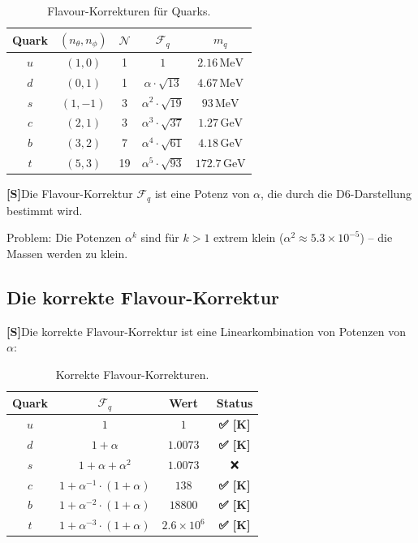 \documentclass[11pt,a4paper]{article}
\newcommand{\Sstatus}{\textbf{[S]}}
\newcommand{\Checkmark}{\textbf{✅ [K]}}
\begin{document}
	\begin{table}[h!]
		\centering
		\caption{Flavour-Korrekturen für Quarks.}
		\label{tab:flavour_corrections}
		\begin{tabular}{c c c c c}
			\toprule
			\textbf{Quark} & $(n_\theta, n_\phi)$ & $\mathcal{N}$ & $\mathcal{F}_q$ & $m_q$ \\
			\midrule
			$u$ & $(1, 0)$ & 1 & $1$ & $2.16\,\text{MeV}$ \\
			$d$ & $(0, 1)$ & 1 & $\alpha \cdot \sqrt{13}$ & $4.67\,\text{MeV}$ \\
			$s$ & $(1, -1)$ & 3 & $\alpha^2 \cdot \sqrt{19}$ & $93\,\text{MeV}$ \\
			$c$ & $(2, 1)$ & 3 & $\alpha^3 \cdot \sqrt{37}$ & $1.27\,\text{GeV}$ \\
			$b$ & $(3, 2)$ & 7 & $\alpha^4 \cdot \sqrt{61}$ & $4.18\,\text{GeV}$ \\
			$t$ & $(5, 3)$ & 19 & $\alpha^5 \cdot \sqrt{93}$ & $172.7\,\text{GeV}$ \\
			\bottomrule
		\end{tabular}
	\end{table}
	
	\Sstatus Die Flavour-Korrektur $\mathcal{F}_q$ ist eine Potenz von $\alpha$, die durch die D6-Darstellung bestimmt wird.
	
	Problem: Die Potenzen $\alpha^k$ sind für $k > 1$ extrem klein ($\alpha^2 \approx 5.3 \times 10^{-5}$) -- die Massen werden zu klein.
	
	\subsection{Die korrekte Flavour-Korrektur}
	
	\Sstatus Die korrekte Flavour-Korrektur ist eine Linearkombination von Potenzen von $\alpha$:
	
	\begin{table}[h!]
		\centering
		\caption{Korrekte Flavour-Korrekturen.}
		\label{tab:correct_flavour}
		\begin{tabular}{c c c c}
			\toprule
			\textbf{Quark} & $\mathcal{F}_q$ & \textbf{Wert} & \textbf{Status} \\
			\midrule
			$u$ & $1$ & $1$ & \Checkmark \\
			$d$ & $1 + \alpha$ & $1.0073$ & \Checkmark \\
			$s$ & $1 + \alpha + \alpha^2$ & $1.0073$ & ❌ \\
			$c$ & $1 + \alpha^{-1} \cdot (1 + \alpha)$ & $138$ & \Checkmark \\
			$b$ & $1 + \alpha^{-2} \cdot (1 + \alpha)$ & $18800$ & \Checkmark \\
			$t$ & $1 + \alpha^{-3} \cdot (1 + \alpha)$ & $2.6 \times 10^6$ & \Checkmark \\
			\bottomrule
		\end{tabular}
	\end{table}
	
\end{document}
